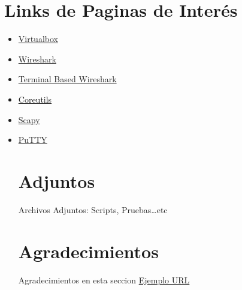 \documentclass[a4paper]{article}
\begin{document}
\clearpage
\newpage
\section{Links de Paginas de Interés \label{Herramientas}}
\begin{itemize}
\item \href{http://virtualbox.org}{Virtualbox}
\item \href{www.wireshark.org}{Wireshark}
\item \href{www.wireshark.org}{Terminal Based Wireshark}
\item \href{http://www.gnu.org/software/coreutils/}{Coreutils}
\item \href{http://www.secdev.org/projects/scapy/}{Scapy}
\item \href{http://www.chiark.greenend.org.uk/~sgtatham/putty/}{PuTTY}
\clearpage
\newpage
\section{Adjuntos}
Archivos Adjuntos: Scripts, Pruebas\ldots etc 
\clearpage
\newpage
\section{Agradecimientos}
Agradecimientos en esta seccion \href{http://www.ejemplourl.org}{Ejemplo URL} 

\end{itemize}
\end{document}
